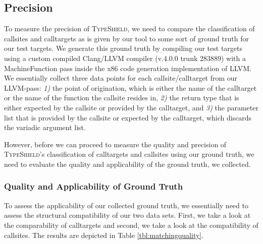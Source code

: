\subsection{Precision}
\label{section:typeshieldprecision}

To measure the precision of \textsc{TypeShield}, we need to compare the classification of callsites and calltargets as is given by our tool to
some sort of ground truth for our test targets. We generate this ground truth by compiling our test targets using a custom compiled Clang/LLVM
compiler (v.4.0.0 trunk 283889) with a MachineFunction pass inside the x86 code generation implementation of LLVM. We essentially 
collect three data points for each callsite/calltarget from our LLVM-pass:
\textit{1)} the point of origination, which is either the name of the calltarget or the name of the function the callsite resides in, 
\textit{2)} the return type that is either expected by the callsite or provided by the calltarget, and 
\textit{3)} the parameter list that is provided by the callsite or expected by the calltarget, which discards the variadic argument list.

However, before we can proceed to measure the quality and precision of \textsc{TypeShield}'s classification of calltargets and callsites
using our ground truth, we need to evaluate the quality and applicability of the ground truth, we collected.

\subsubsection{Quality and Applicability of Ground Truth}
\label{subsection:typeshieldprecision}
To assess the applicability of our collected ground truth, we essentially need to assess the structural compatibility of our two data sets.
First, we take a look at the comparability of calltargets and second, we take a look at the compatibility of callsites. The results are depicted in Table \ref{tbl:matchingquality}.

